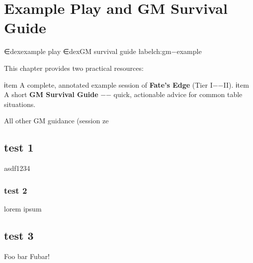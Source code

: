 \chapter{Example Play and GM Survival Guide}
∈dex{example play}
∈dex{GM survival guide}
łabel{ch:gm−example}

This chapter provides two practical resources:
\begin{enumerate}
  ℹtem A complete, annotated example session of \textbf{Fate's Edge} (Tier I−−II).
  ℹtem A short \textbf{GM Survival Guide} −− quick, actionable advice for common table situations.
\end{enumerate}
All other GM guidance (session ze

\section{test 1}
asdf1234

\subsection{test 2}
lorem ipsum

\section{test 3}

Foo bar Fubar!